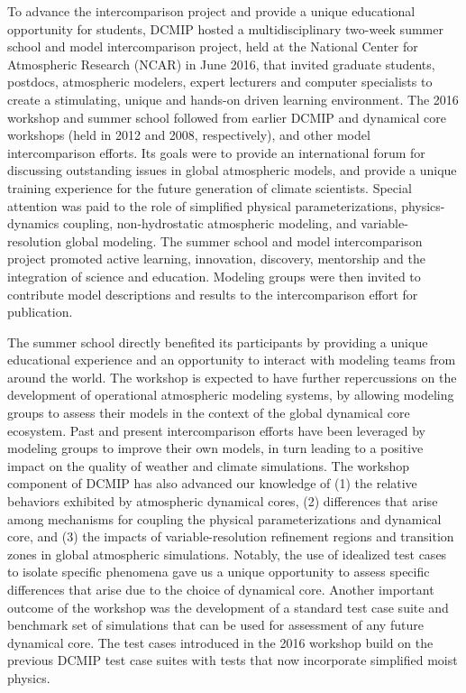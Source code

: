 \documentclass[gmd, manuscript]{copernicus}
\begin{document}
To advance the intercomparison project and provide a unique educational opportunity for students, DCMIP hosted a multidisciplinary two-week summer school and model intercomparison project, held at the National Center for Atmospheric Research (NCAR) in June 2016, that invited graduate students, postdocs, atmospheric modelers, expert lecturers and computer specialists to create a stimulating, unique and hands-on driven learning environment. The 2016 workshop and summer school followed from earlier DCMIP and dynamical core workshops (held in 2012 and 2008, respectively), and other model intercomparison efforts.  Its goals were to provide an international forum for discussing outstanding issues in global atmospheric models, and provide a unique training experience for the future generation of climate scientists. Special attention was paid to the role of simplified physical parameterizations, physics-dynamics coupling, non-hydrostatic atmospheric modeling, and variable-resolution global modeling. The summer school and model intercomparison project promoted active learning, innovation, discovery, mentorship and the integration of science and education.  Modeling groups were then invited to contribute model descriptions and results to the intercomparison effort for publication.

The summer school directly benefited its participants by providing a unique educational experience and an opportunity to interact with modeling teams from around the world.  The workshop is expected to have further repercussions on the development of operational atmospheric modeling systems, by allowing modeling groups to assess their models in the context of the global dynamical core ecosystem.  Past and present intercomparison efforts have been leveraged by modeling groups to improve their own models, in turn leading to a positive impact on the quality of weather and climate simulations.  The workshop component of DCMIP has also advanced our knowledge of (1) the relative behaviors exhibited by atmospheric dynamical cores, (2) differences that arise among mechanisms for coupling the physical parameterizations and dynamical core, and (3) the impacts of variable-resolution refinement regions and transition zones in global atmospheric simulations.  Notably, the use of idealized test cases to isolate specific phenomena gave us a unique opportunity to assess specific differences that arise due to the choice of dynamical core.  Another important outcome of the workshop was the development of a standard test case suite and benchmark set of simulations that can be used for assessment of any future dynamical core.  The test cases introduced in the 2016 workshop build on the previous DCMIP test case suites \citep{jablonowski2008idealized, ullrich2012dynamical} with tests that now incorporate simplified moist physics.
\end{document}
